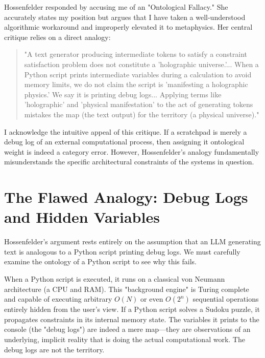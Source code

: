 \documentclass[12pt,a4paper]{article}
\begin{document}
Hossenfelder \citep{hossenfelder2026_holographic} responded by accusing me of an "Ontological Fallacy." She accurately states my position but argues that I have taken a well-understood algorithmic workaround and improperly elevated it to metaphysics. Her central critique relies on a direct analogy:

\begin{quote}
"A text generator producing intermediate tokens to satisfy a constraint satisfaction problem does not constitute a 'holographic universe.'... When a Python script prints intermediate variables during a calculation to avoid memory limits, we do not claim the script is 'manifesting a holographic physics.' We say it is printing debug logs... Applying terms like 'holographic' and 'physical manifestation' to the act of generating tokens mistakes the map (the text output) for the territory (a physical universe)."
\end{quote}

I acknowledge the intuitive appeal of this critique. If a scratchpad is merely a debug log of an external computational process, then assigning it ontological weight is indeed a category error. However, Hossenfelder's analogy fundamentally misunderstands the specific architectural constraints of the systems in question.

\section{The Flawed Analogy: Debug Logs and Hidden Variables}

Hossenfelder's argument rests entirely on the assumption that an LLM generating text is analogous to a Python script printing debug logs. We must carefully examine the ontology of a Python script to see why this fails.

When a Python script is executed, it runs on a classical von Neumann architecture (a CPU and RAM). This "background engine" is Turing complete and capable of executing arbitrary $O(N)$ or even $O(2^n)$ sequential operations entirely hidden from the user's view. If a Python script solves a Sudoku puzzle, it propagates constraints in its internal memory state. The variables it prints to the console (the "debug logs") are indeed a mere map—they are observations of an underlying, implicit reality that is doing the actual computational work. The debug logs are not the territory.
\end{document}

